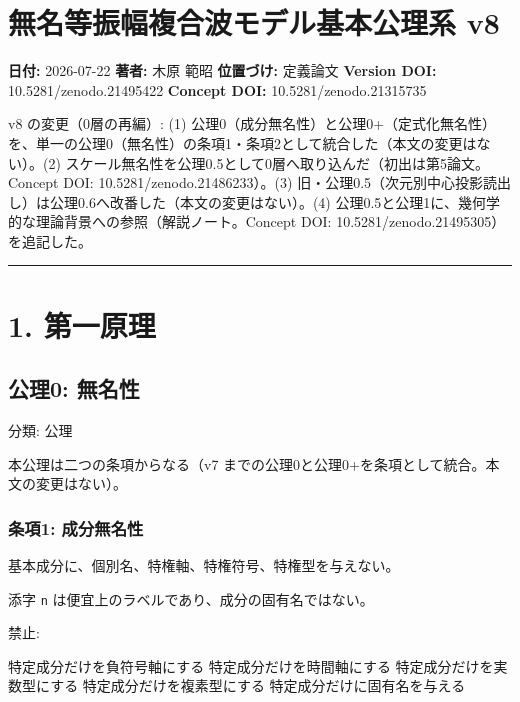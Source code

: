\documentclass[
  a4paper,
]{ltjsarticle}
\author{}
\date{}
\newenvironment{Shaded}{}{}
\newcommand{\NormalTok}[1]{#1}
\begin{document}
\section{無名等振幅複合波モデル基本公理系
v8}\label{ux7121ux540dux7b49ux632fux5e45ux8907ux5408ux6ce2ux30e2ux30c7ux30ebux57faux672cux516cux7406ux7cfb-v8}

\textbf{日付:} 2026-07-22 \textbf{著者:} 木原 範昭 \textbf{位置づけ:}
定義論文 \textbf{Version DOI:} 10.5281/zenodo.21495422 \textbf{Concept
DOI:} 10.5281/zenodo.21315735

v8 の変更（0層の再編）: (1)
公理0（成分無名性）と公理0+（定式化無名性）を、単一の公理0（無名性）の条項1・条項2として統合した（本文の変更はない）。(2)
スケール無名性を公理0.5として0層へ取り込んだ（初出は第5論文。Concept
DOI: 10.5281/zenodo.21486233）。(3)
旧・公理0.5（次元別中心投影読出し）は公理0.6へ改番した（本文の変更はない）。(4)
公理0.5と公理1に、幾何学的な理論背景への参照（解説ノート。Concept DOI:
10.5281/zenodo.21495305）を追記した。

\begin{center}\rule{0.5\linewidth}{0.5pt}\end{center}

\section{1. 第一原理}\label{ux7b2cux4e00ux539fux7406}

\subsection{公理0: 無名性}\label{ux516cux74060-ux7121ux540dux6027}

分類: 公理

本公理は二つの条項からなる（v7
までの公理0と公理0+を条項として統合。本文の変更はない）。

\subsubsection{条項1:
成分無名性}\label{ux6761ux98051-ux6210ux5206ux7121ux540dux6027}

基本成分に、個別名、特権軸、特権符号、特権型を与えない。

添字 \texttt{n} は便宜上のラベルであり、成分の固有名ではない。

禁止:

\begin{Shaded}
\begin{Highlighting}[]
\NormalTok{特定成分だけを負符号軸にする}
\NormalTok{特定成分だけを時間軸にする}
\NormalTok{特定成分だけを実数型にする}
\NormalTok{特定成分だけを複素型にする}
\NormalTok{特定成分だけに固有名を与える}
\end{Highlighting}
\end{Shaded}
\end{document}
